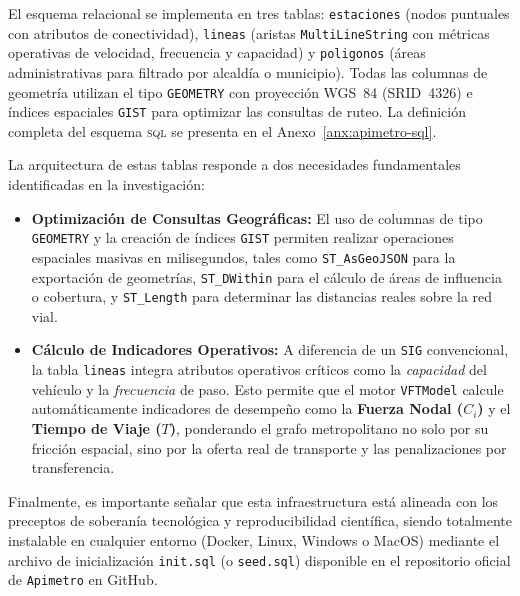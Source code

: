 El esquema relacional se implementa en tres tablas: \texttt{estaciones} (nodos puntuales con atributos de conectividad), \texttt{lineas} (aristas \texttt{MultiLineString} con métricas operativas de velocidad, frecuencia y capacidad) y \texttt{poligonos} (áreas administrativas para filtrado por alcaldía o municipio). Todas las columnas de geometría utilizan el tipo \texttt{GEOMETRY} con proyección WGS~84 (SRID~4326) e índices espaciales \texttt{GIST} para optimizar las consultas de ruteo. La definición completa del esquema \textsc{sql} se presenta en el Anexo~\ref{anx:apimetro-sql}.

La arquitectura de estas tablas responde a dos necesidades fundamentales identificadas en la investigación:
\begin{itemize}
    \item \textbf{Optimización de Consultas Geográficas:} El uso de columnas de tipo \texttt{GEOMETRY} y la creación de índices
    \texttt{GIST} permiten realizar operaciones espaciales masivas en milisegundos, tales como \texttt{ST\_AsGeoJSON} para la
    exportación de geometrías, \texttt{ST\_DWithin} para el cálculo de áreas de influencia o cobertura, y \texttt{ST\_Length} para
    determinar las distancias reales sobre la red vial.
    \item \textbf{Cálculo de Indicadores Operativos:} A diferencia de un \texttt{SIG}
    convencional, la tabla \texttt{lineas} integra atributos operativos críticos como la \textit{capacidad} del vehículo y la
    \textit{frecuencia} de paso. Esto permite que el motor \texttt{VFTModel} calcule automáticamente indicadores de desempeño como la
    \textbf{Fuerza Nodal ($C_i$)} y el \textbf{Tiempo de Viaje ($T$)}, ponderando el grafo metropolitano no solo por su fricción espacial,
    sino por la oferta real de transporte y las penalizaciones por transferencia.
\end{itemize}

Finalmente, es importante señalar que esta infraestructura está alineada con los preceptos de soberanía tecnológica y reproducibilidad
científica, siendo totalmente instalable en cualquier entorno (Docker, Linux, Windows o MacOS) mediante el archivo de inicialización
\texttt{init.sql} (o \texttt{seed.sql}) disponible en el repositorio oficial de \texttt{Apimetro} en GitHub.


